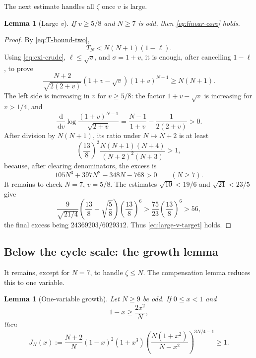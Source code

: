 \documentclass[11pt]{article}
\newtheorem{lemma}[theorem]{Lemma}
\newcommand{\dd}{\,\mathrm d}
\begin{document}
The next estimate handles all \(\zeta\) once \(v\) is large.

\begin{lemma}[Large \(v\)]\label{lem:linear-large-v}
If \(v\ge5/8\) and \(N\ge7\) is odd, then
\eqref{eq:linear-core} holds.
\end{lemma}

\begin{proof}
By \eqref{eq:T-bound-two},
\begin{equation}\label{eq:T-geometric-cancel}
       T_N<N(N+1)(1-\ell).
\end{equation}
Using \eqref{eq:cxi-crude}, \(\ell\le\sqrt v\), and
\(\sigma=1+v\), it is enough, after cancelling \(1-\ell\), to prove
\begin{equation}\label{eq:large-v-target}
 \frac{N+2}{\sqrt{2(2+v)}}
 (1+v-\sqrt v)(1+v)^{N-1}
 \ge N(N+1).
\end{equation}
The left side is increasing in \(v\) for \(v\ge5/8\): the factor
\(1+v-\sqrt v\) is increasing for \(v>1/4\), and
\[
 \frac{\dd}{\dd v}\log\frac{(1+v)^{N-1}}{\sqrt{2+v}}
 =\frac{N-1}{1+v}-\frac1{2(2+v)}>0.
\]
After division by \(N(N+1)\), its ratio under \(N\mapsto N+2\) is at least
\[
 \left(\frac{13}{8}\right)^2
 \frac{N(N+1)(N+4)}{(N+2)^2(N+3)}>1,
\]
because, after clearing denominators, the excess is
\[
       105N^3+397N^2-348N-768>0
       \qquad(N\ge7).
\]
It remains to check \(N=7\), \(v=5/8\).  The estimates
\(\sqrt{10}<19/6\) and \(\sqrt{21}<23/5\) give
\[
 \frac9{\sqrt{21/4}}
 \left(\frac{13}{8}-\sqrt{\frac58}\right)
 \left(\frac{13}{8}\right)^6
 >\frac{75}{23}\left(\frac{13}{8}\right)^6
 >56,
\]
the final excess being \(24369203/6029312\).  Thus
\eqref{eq:large-v-target} holds.
\end{proof}

\subsection{Below the cycle scale: the growth lemma}

It remains, except for \(N=7\), to handle \(\zeta\le N\).  The compensation
lemma reduces this to one variable.

\begin{lemma}[One-variable growth]\label{lem:J-growth}
Let \(N\ge9\) be odd.  If \(0\le x<1\) and
\begin{equation}\label{eq:J-domain}
       1-x\ge\frac{2x^2}{N},
\end{equation}
then
\begin{equation}\label{eq:J-ineq}
 J_N(x):=
 \frac{N+2}{N}(1-x)^2(1+x^3)
 \left(\frac{N(1+x^2)}{N-x^2}\right)^{3N/4-1}
 \ge1.
\end{equation}
\end{lemma}
\end{document}
